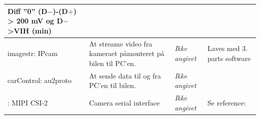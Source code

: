 \begin{table}[h]
\begin{tabularx}{\textwidth}{|l|X|X|X|}
		Diff ''0''						\newline
		(D$-$)-(D$+$) > 200 mV				\newline
		og D$-$>VIH (min)					\newline
	\\ \hline	
	
imagestr: IPcam
	& At streame video fra kameraet påmonteret på bilen til PC'en.
	& \textit{Ikke angivet} 
	& Laves med 3. parts software	
	\\ \hline

carControl: au2proto
	& At sende data til og fra PC'en til bilen.
	& \textit{Ikke angivet} 
	& ~
	\\ \hline
	
: MIPI CSI-2
	& Camera serial interface
	& \textit{Ikke angivet} 
	& Se reference: \cite{lib:MIPICSI-2}
	\\ \hline
	\end{tabularx}
\end{table}
